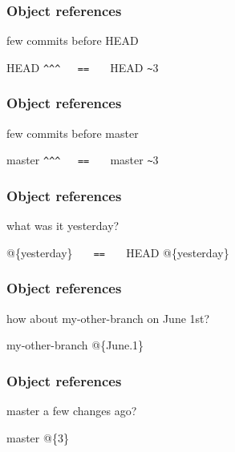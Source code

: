 \documentclass[english]{beamer}
\newcommand{\faint}[1]{%
\textcolor{code-gray}{#1}%
}
\begin{document}
\begin{frame}[fragile]
\frametitle{Object references}

few commits before HEAD

\vspace{.1\textheight}
\begin{center}
        \faint{HEAD}\verb!^^^   ==   ! \faint{HEAD}\verb!~!3
\end{center}

\end{frame}

\begin{frame}[fragile]
\frametitle{Object references}

few commits before master

\vspace{.1\textheight}
\begin{center}
        \faint{master}\verb!^^^   ==   ! \faint{master}\verb!~!3
\end{center}

\end{frame}

\begin{frame}[fragile]
\frametitle{Object references}

what was it yesterday?

\vspace{.1\textheight}
\begin{center}
        @\{yesterday\} \verb!   ==   ! \faint{HEAD}@\{yesterday\}
\end{center}

\end{frame}

\begin{frame}
\frametitle{Object references}

how about my-other-branch on June 1st?

\vspace{.1\textheight}
\begin{center}
        \faint{my-other-branch}@\{June.1\}
\end{center}

\end{frame}

\begin{frame}
\frametitle{Object references}

master a few changes ago?

\vspace{.1\textheight}
\begin{center}
        \faint{master}@\{3\}
\end{center}

\end{frame}
\end{document}
